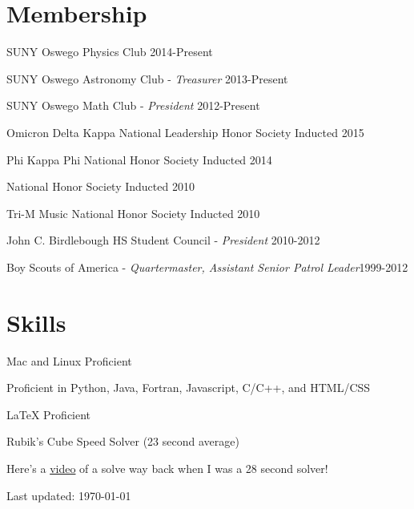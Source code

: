 \documentclass[8pt]{article}
\def\footerlink{}
\renewenvironment{itemize}{
  \begin{list}{}{
    \setlength{\leftmargin}{1.5em}
  }
}{
  \end{list}
}
\begin{document}
\section*{Membership}
\begin{itemize}
\item SUNY Oswego Physics Club \hfill 2014-Present
\item SUNY Oswego Astronomy Club - \emph{Treasurer} \hfill 2013-Present
\item SUNY Oswego Math Club - \emph{President} \hfill 2012-Present
\item Omicron Delta Kappa National Leadership Honor Society \hfill Inducted 2015
\item Phi Kappa Phi National Honor Society \hfill Inducted 2014
\item National Honor Society \hfill Inducted 2010
\item Tri-M Music National Honor Society \hfill Inducted 2010
\item John C. Birdlebough HS Student Council - \emph{President} \hfill 2010-2012
\item Boy Scouts of America - \emph{Quartermaster, Assistant Senior Patrol Leader}\hfill 1999-2012
\end{itemize}

\section*{Skills}
\begin{itemize}
\item Mac and Linux Proficient
\item Proficient in Python, Java, Fortran, Javascript, C/C++, and HTML/CSS
\item {\LaTeX} Proficient
\item Rubik's Cube Speed Solver (23 second average)

Here's a \href{https://youtu.be/qPBg2xok04s}{video} of a solve way back when I was a 28 second solver! 
\end{itemize}

\bigskip

\begin{center}
  \begin{footnotesize}
    Last updated: \today \\
    \href{\footerlink}{\texttt{\footerlink}}
  \end{footnotesize}
\end{center}
\end{document}
